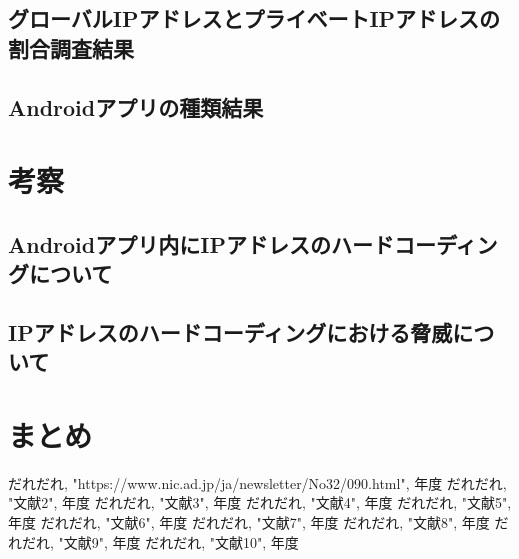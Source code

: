 \documentclass[a4j]{jarticle}
\begin{document}
\subsection{グローバルIPアドレスとプライベートIPアドレスの割合調査結果}
\subsection{Androidアプリの種類結果}


\newpage
\section{考察}
\subsection{Androidアプリ内にIPアドレスのハードコーディングについて}
\subsection{IPアドレスのハードコーディングにおける脅威について}

\newpage
\section{まとめ}

\newpage
\begin{thebibliography}{99}
だれだれ, "https://www.nic.ad.jp/ja/newsletter/No32/090.html", 年度
だれだれ, "文献2", 年度
だれだれ, "文献3", 年度
だれだれ, "文献4", 年度
だれだれ, "文献5", 年度
だれだれ, "文献6", 年度
だれだれ, "文献7", 年度
だれだれ, "文献8", 年度
だれだれ, "文献9", 年度
だれだれ, "文献10", 年度

\end{thebibliography}
\end{document}
